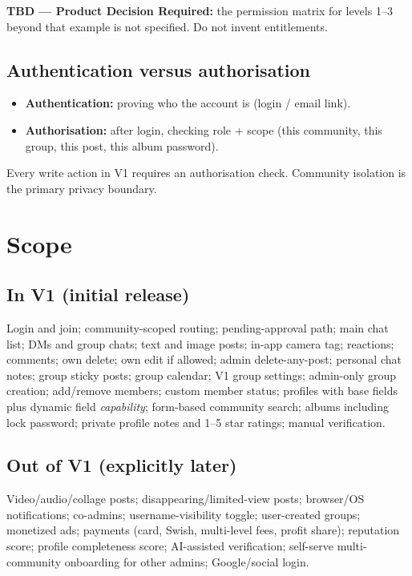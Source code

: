 \documentclass[11pt,a4paper]{article}
\begin{document}
\textbf{TBD --- Product Decision Required:} the permission matrix for levels 1--3 beyond that example is not specified. Do not invent entitlements.

\subsection{Authentication versus authorisation}
\begin{itemize}
  \item \textbf{Authentication:} proving who the account is (login / email link).
  \item \textbf{Authorisation:} after login, checking role + scope (this community, this group, this post, this album password).
\end{itemize}
Every write action in V1 requires an authorisation check. Community isolation is the primary privacy boundary.

\section{Scope}

\subsection{In V1 (initial release)}
Login and join; community-scoped routing; pending-approval path; main chat list; DMs and group chats; text and image posts; in-app camera tag; reactions; comments; own delete; own edit if allowed; admin delete-any-post; personal chat notes; group sticky posts; group calendar; V1 group settings; admin-only group creation; add/remove members; custom member status; profiles with base fields plus dynamic field \emph{capability}; form-based community search; albums including lock password; private profile notes and 1--5 star ratings; manual verification.

\subsection{Out of V1 (explicitly later)}
Video/audio/collage posts; disappearing/limited-view posts; browser/OS notifications; co-admins; username-visibility toggle; user-created groups; monetized ads; payments (card, Swish, multi-level fees, profit share); reputation score; profile completeness score; AI-assisted verification; self-serve multi-community onboarding for other admins; Google/social login.
\end{document}
